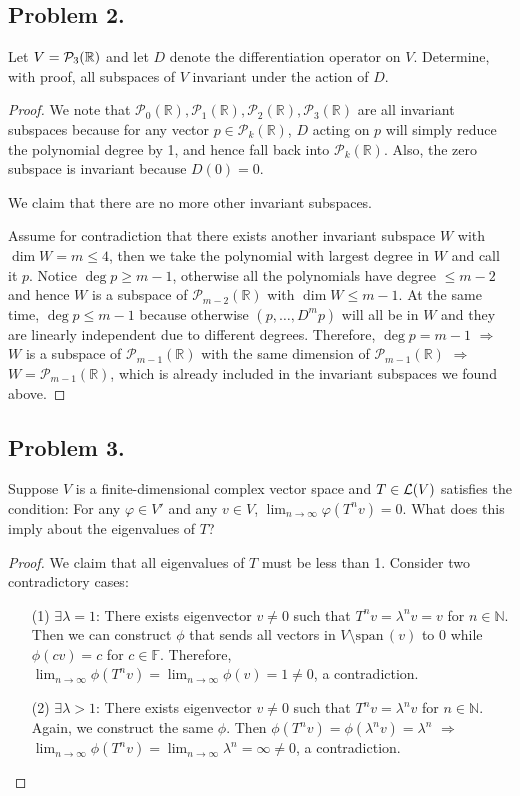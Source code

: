 \documentclass{article}
\newcommand*{\spann}{\ensuremath{\mathrm{span}}\,}
\renewcommand*{\implies}{\ensuremath{\Longrightarrow}}
\newcommand*{\R}{\ensuremath{\mathbb{R}}}
\newcommand*{\F}{\ensuremath{\mathbb{F}}}
\newcommand*{\N}{\ensuremath{\mathbb{N}}}
\newcommand*{\p}{\ensuremath{\mathcal{P}}}
\begin{document}
\newpage
\subsection*{Problem 2.}
Let $V={\cal P}_3(\R)$ and let $D$ denote the differentiation operator on $V$. 
Determine, with proof,  all subspaces of $V$ invariant under the action of $D$. 
\begin{proof}
    We note that $\p_0(\R), \p_1(\R), \p_2(\R), \p_3(\R)$ are all invariant subspaces because 
    for any vector $p\in \p_k(\R)$, $D$ acting on $p$ will simply reduce the polynomial degree by 1, 
    and hence fall back into $\p_k(\R)$. Also, the zero subspace is invariant because $D(0)=0$.

    We claim that there are no more other invariant subspaces. 
    
    Assume for contradiction that there exists 
    another invariant subspace $W$ with $\dim W = m \le 4$, then we take the polynomial with largest 
    degree in $W$ and call it $p$. Notice $\deg p \ge m-1$, otherwise all the polynomials have 
    degree $\le m-2$ and hence $W$ is a subspace of $\p_{m-2}(\R)$ with $\dim W\le m-1$. At the same time, 
    $\deg p \le m-1$ because otherwise $(p,\dots, D^mp)$ will all be in $W$ and they 
    are linearly independent due to different degrees. Therefore, $\deg p = m-1$ \implies 
    $W$ is a subspace of $\p_{m-1}(\R)$ with the same dimension of $\p_{m-1}(\R)$ \implies 
    $W = \p_{m-1}(\R)$, which is already included in the invariant subspaces we found above. 
\end{proof}

\newpage
\subsection*{Problem 3.}
Suppose $V$ is a finite-dimensional complex vector space and  $T\in {\cal L}(V)$ satisfies the 
condition: For any $\varphi\in V'$ and any $v\in V$, $\lim_{n\to \infty} \varphi(T^n v)=0.$ What 
does this imply about the eigenvalues of $T$? 
\begin{proof}
    We claim that all eigenvalues of $T$ must be less than 1. Consider two contradictory cases: 
    \begin{enumerate}
        \item [(1) $\exists \lambda = 1$:] 
        There exists eigenvector $v\neq 0$ such that $T^nv = \lambda^nv=v$ for $n\in\N$. Then we can
        construct $\phi$ that sends all vectors in $V\setminus \spann(v)$ to 0 while 
        $\phi(cv) = c$ for $c\in\F$. Therefore, $\lim_{n\to\infty}\phi(T^nv)=
        \lim_{n\to\infty}\phi(v)=1\neq 0$, a contradiction.
        
        \item [(2) $\exists \lambda > 1$:] There exists eigenvector $v\neq 0$ such that 
        $T^nv = \lambda^nv$ for $n\in\N$. Again, we construct the same $\phi$. Then 
        $\phi(T^nv)=\phi(\lambda^nv)=\lambda^n$ \implies $\lim_{n\to\infty}\phi(T^nv)=\lim_{n\to\infty}\lambda^n=
        \infty\neq 0$, a contradiction.
    \end{enumerate}
\end{proof}
\end{document}
